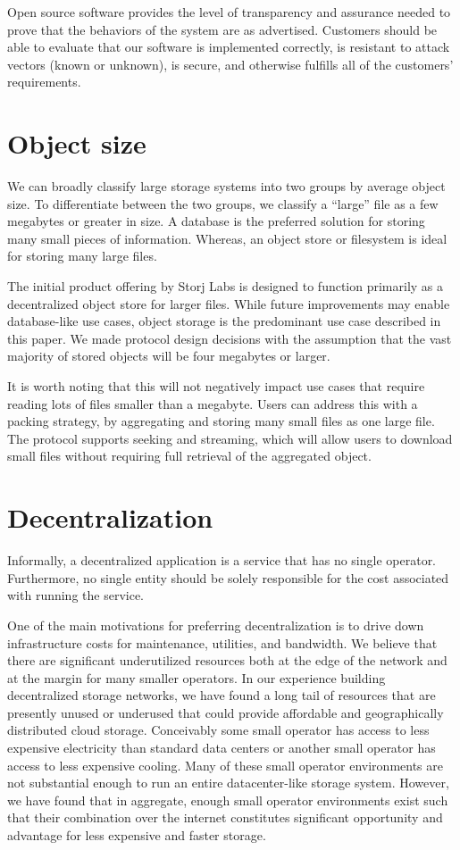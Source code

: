 \documentclass[11pt,fleqn,openany]{book}
\begin{document}
Open source software
provides the level of transparency and assurance needed to prove that the
behaviors of the system are as advertised. Customers should be able to
evaluate that our software is implemented correctly, is resistant to
attack vectors (known or unknown), is secure, and otherwise fulfills all
of the customers' requirements.

\section{Object size}

We can broadly classify large storage systems into two groups by average
object size. To differentiate between the two groups, we classify a ``large'' file as a
few megabytes or greater in size. A database is the preferred solution for storing many small pieces of information. Whereas, an object store or filesystem is ideal for storing many large files.

The initial product offering by Storj Labs is designed to function primarily as
a decentralized object store for larger files.
While future improvements may enable
database-like use cases, object storage is the predominant use case described in
this paper. We made protocol design decisions with the assumption that the
vast majority of stored objects will be four megabytes or larger.

It is worth noting that this will not negatively impact use cases that
require reading lots of files smaller than a megabyte. Users can address this
with a packing strategy, by aggregating and storing many small files as one
large file.
The protocol supports seeking and streaming, which will allow users to download small files
without requiring full retrieval of the aggregated object.

\section{Decentralization}

Informally, a decentralized application is a service that has no single
operator. Furthermore, no single entity should be solely responsible for the
cost associated with running the service.

One of the main motivations for preferring decentralization is to drive
down infrastructure costs for maintenance, utilities, and bandwidth.
We believe that there
are significant underutilized resources both at the edge of the network and at
the margin for many smaller operators. In our experience building decentralized
storage networks, we have found a long tail of resources that are presently
unused or underused that could provide affordable and
geographically distributed cloud storage. Conceivably some small operator
has access to less expensive electricity than standard data centers or another small
operator has access to less expensive cooling. Many of these small operator
environments are not substantial enough to run an entire datacenter-like
storage system. However, we have found that in aggregate, enough small operator
environments exist such that their combination over the internet constitutes
significant opportunity and advantage for less expensive and faster storage.
\end{document}
